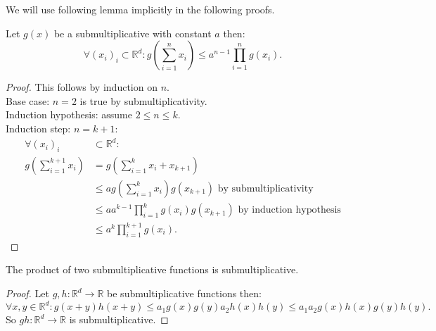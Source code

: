\documentclass[a4paper,11pt]{article}
\begin{document}
We will use following lemma implicitly in the following proofs.

\begin{lemma}
    Let $g(x)$ be a submultiplicative with constant $a$ then:
    \begin{equation}
        \forall (x_{i})_{i} \subset \mathbb{R}^d:
        g\left(\sum_{i=1}^{n} x_{i}\right) \le a^{n-1} \prod_{i=1}^{n} g(x_{i})  .
    \end{equation}
\end{lemma}

\begin{proof}
    This follows by induction on $n$. \\
    Base case: $n=2$ is true by submultiplicativity. \\
    Induction hypothesis: assume $2 \le  n \le k$. \\
    Induction step: $n=k+1$:
    \begin{align}
        \forall (x_{i})_{i}                  & \subset \mathbb{R}^d:                                                                          \\
        g\left(\sum_{i=1}^{k+1} x_{i}\right) & = g\left(\sum_{i=1}^{k} x_{i} + x_{k+1}\right)                                                 \\
                                             & \le a g\left(\sum_{i=1}^{k} x_{i}\right) g(x_{k+1})  \text{ by submultiplicativity}            \\
                                             & \le a a^{k-1} \prod_{i=1}^{k}  g\left(x_{i}\right) g(x_{k+1})  \text{ by induction hypothesis} \\
                                             & \le a^{k} \prod_{i=1}^{k+1}  g\left(x_{i}\right) .
    \end{align}
\end{proof}

\begin{lemma}
    The product of two submultiplicative functions is submultiplicative.
\end{lemma}

\begin{proof}
    Let $g,h:\mathbb{R}^{d}\rightarrow \mathbb{R}$ be submultiplicative functions then:
    $$
        \forall x,y \in \mathbb{R}^{d}: g(x+y)h(x+y) \le a_{1} g(x)g(y) a_{2} h(x)h(y) \leq a_{1}a_{2} g(x)h(x)g(y)h(y).
    $$
    So $gh:\mathbb{R}^{d}\rightarrow \mathbb{R}$ is submultiplicative.
\end{proof}
\end{document}

